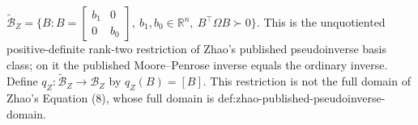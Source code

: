 \(\widetilde{\mathcal B}_Z=\{B:B=\begin{bmatrix}b_1&0\\0&b_0\end{bmatrix},\ b_1,b_0\in\mathbb R^n,\ B^{\top}\Omega B\succ0\}\).  This is the unquotiented positive-definite rank-two restriction of Zhao's published pseudoinverse basis class; on it the published Moore--Penrose inverse equals the ordinary inverse.  Define \(q_Z:\widetilde{\mathcal B}_Z\to\mathcal B_Z\) by \(q_Z(B)=[B]\).  This restriction is not the full domain of Zhao's Equation (8), whose full domain is def:zhao-published-pseudoinverse-domain.